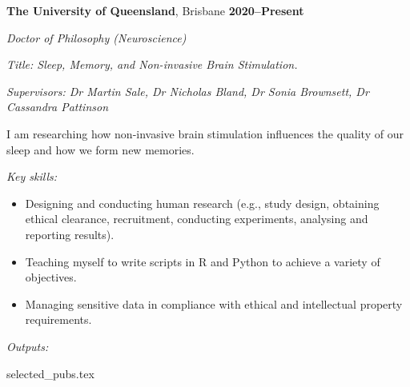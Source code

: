 \textbf{The University of Queensland}, Brisbane \hfill \textbf{2020--Present} \par
\textit{Doctor of Philosophy (Neuroscience)} \par
\textit{Title: Sleep, Memory, and Non-invasive Brain Stimulation.}\par
\textit{Supervisors: Dr Martin Sale, Dr Nicholas Bland, Dr Sonia Brownsett, Dr Cassandra Pattinson}\par
I am researching how non-invasive brain stimulation influences the quality of our sleep and how we form new memories.\par
\vspace{1mm}
\textit{Key skills:} \par
\begin{itemize}
	\item Designing and conducting human research (e.g., study design, obtaining ethical clearance, recruitment, conducting experiments, analysing and reporting results).
	\item Teaching myself to write scripts in R and Python to achieve a variety of objectives.
	\item Managing sensitive data in compliance with ethical and intellectual property requirements.
\end{itemize}\par
\vspace{1mm}
\textit{Outputs:}
\begin{enumerate}
	{selected_pubs.tex}
\end{enumerate}\par